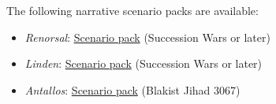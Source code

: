 The following narrative scenario packs are available:

\begin{itemize}

\item \emph{Renorsal}: \href{https://raw.githubusercontent.com/Eudicods/outworlds-wastes-legacy/rules-pdf/renorsal.pdf}{Scenario pack} (Succession Wars or later)

\item \emph{Linden}: \href{https://raw.githubusercontent.com/Eudicods/outworlds-wastes-legacy/rules-pdf/linden.pdf}{Scenario pack} (Succession Wars or later)

\item \emph{Antallos}: \href{https://raw.githubusercontent.com/Eudicods/outworlds-wastes-legacy/rules-pdf/antallos.pdf}{Scenario pack} (Blakist Jihad 3067)

\end{itemize}
